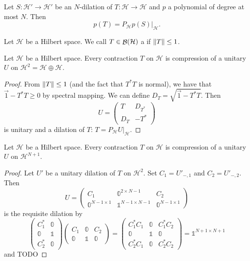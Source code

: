 \begin{lemma}
Let $S:\mathcal{H}'\to\mathcal{H}'$ be an $N$-dilation of $T: \mathcal{H}\to \mathcal{H}$ and $p$ a polynomial of degree at most $N$. Then
\[ p(T) = P_\mathcal{H}p(S)|_\mathcal{H}. \]
\end{lemma}

Let $\mathcal{H}$ be a Hilbert space. We call $T\in\mathop{\mathcal{B}}(\mathcal{H})$ a  if $\lVert T\rVert\leq 1$.
\begin{lemma}
Let $\mathcal{H}$ be a Hilbert space. Every contraction $T$ on $\mathcal{H}$ is compression of a unitary $U$ on $\mathcal{H}^2 = \mathcal{H}\oplus \mathcal{H}$.
\end{lemma}
\begin{proof}
From $\lVert T\rVert\leq 1$ (and the fact that $T^*T$ is normal), we have that $\vec{1}-T^*T\geq 0$ by spectral mapping. We can define $D_T = \sqrt{\vec{1}-T^*T}$. Then
\[ U = \begin{pmatrix}
T & D_{T^*} \\ D_T & -T^*
\end{pmatrix} \]
is unitary and a dilation of $T$: $T=P_\mathcal{H}U|_\mathcal{H}$.
\end{proof}
\begin{lemma}
Let $\mathcal{H}$ be a Hilbert space. Every contraction $T$ on $\mathcal{H}$ is compression of a unitary $U$ on $\mathcal{H}^{N+1}$.
\end{lemma}
\begin{proof}
Let $U'$ be a unitary dilation of $T$ on $\mathcal{H}^2$. Set $C_1 = U'_{-,1}$ and $C_2 = U'_{-,2}$. Then
\[ U = \begin{pmatrix}
C_1 & \mathbb{0}^{2\times N-1} & C_2 \\
\mathbb{0}^{N-1\times 1} & \mathbb{1}^{N-1\times N-1} & \mathbb{0}^{N-1\times 1}
\end{pmatrix} \]
is the requisite dilation by
\[ \begin{pmatrix}
C_1^* & \mathbb{0} \\
\mathbb{0} & \mathbb{1} \\
C_2^* & \mathbb{0}
\end{pmatrix}\begin{pmatrix}
C_1 & \mathbb{0} & C_2 \\
\mathbb{0} & \mathbb{1} & \mathbb{0}
\end{pmatrix} = \begin{pmatrix}
C_1^*C_1 & \mathbb{0} & C_1^*C_2 \\
\mathbb{0} & \mathbb{1} & \mathbb{0} \\
C_2^*C_1 & \mathbb{0} & C_2^*C_2
\end{pmatrix} = \mathbb{1}^{N+1\times N+1} \]
and TODO
\end{proof}


